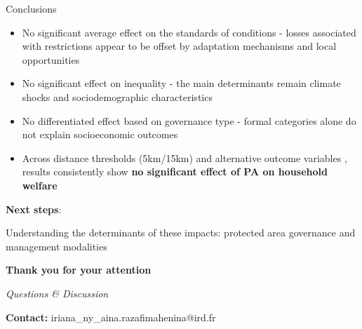 \documentclass[
  ignorenonframetext,
  aspectratio=169,
]{beamer}
\begin{document}
\begin{frame}{Conclusions}
\protect{}\label{conclusions}
\begin{itemize}
\item
  No significant average effect on the standards of conditions - losses
  associated with restrictions appear to be offset by adaptation
  mechanisms and local opportunities
\item
  No significant effect on inequality - the main determinants remain
  climate shocks and sociodemographic characteristics
\item
  No differentiated effect based on governance type - formal categories
  alone do not explain socioeconomic outcomes
\item
  Across distance thresholds (5km/15km) and alternative outcome
  variables , results consistently show \textbf{no significant effect of
  PA on household welfare}
\end{itemize}

\textbf{Next steps}:

Understanding the determinants of these impacts: protected area
governance and management modalities
\end{frame}

\begin{frame}{}
\protect{}\label{section}
\vfill

\begin{center}

{\Large \textbf{Thank you for your attention}}

\vspace{1cm}

{\normalsize \textit{Questions \& Discussion}}

\vspace{1.5cm}

{\small \textbf{Contact:} iriana\_ny\_aina.razafimahenina@ird.fr}

\end{center}

\vfill
\end{frame}
\end{document}
